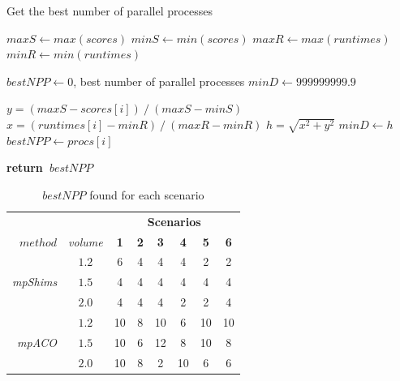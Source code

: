 \documentclass[preprint,authoryear]{elsarticle}
\renewcommand{\Return}{\State \bf {return}~}
\begin{document}
\begin{algorithm}[H]
	\caption{Get the best number of parallel processes}  \label{alg:bestnum}
	\begin{algorithmic}[1]
		
				
		\State $maxS   \gets max(scores)$
		\State $minS   \gets min(scores)$
		\State $maxR \gets max(runtimes)$
		\State $minR \gets min(runtimes)$
		
		\State $bestNPP \gets 0$, best number of parallel processes
		\State $minD \gets 999999999.9$		
		
			\State $y = ( maxS - scores[i] )\ /\ (maxS   - minS  )$ 
			\State $x = ( runtimes[i] - minR )\ /\ (maxR - minR)$ 
			\State $h = \sqrt{x^2 + y^2}$  
				\State $minD \gets h$
				\State $bestNPP \gets procs[i]$
			\EndIf
		
		\EndFor
		
		\Return $bestNPP$
		
		\EndProcedure
	\end{algorithmic}
\end{algorithm}


\vspace{2.0mm}

\begin{table}[H]
\centering
\caption{$bestNPP$ found for each scenario}  \label{tab:numProcs}
	\footnotesize
\begin{tabular}{rccccccc}
\toprule
                               &               &\multicolumn{6}{c}{\bf Scenarios} \\
                               \cmidrule{3-8}
{$method$}                     &{\it volume}&{\bf 1}&{\bf 2}&{\bf 3}&{\bf 4}&{\bf 5}&{\bf 6} \\
\toprule

\multirow{3}{*}{\it {mpShims}} &$1.2$& 6       & 4     & 4     & 4     & 2     & 2    \\ 
                               &$1.5$& 4       & 4     & 4     & 4     & 4     & 4    \\
                               &$2.0$& 4       & 4     & 4     & 2     & 2     & 4    \\
\midrule[.1pt]

\multirow{3}{*}{\it {mpACO}}   &$1.2$& 10      & 8     & 10    & 6     & 10    & 10   \\ 
                               &$1.5$& 10      & 6     & 12    & 8     & 10    & 8    \\
                               &$2.0$& 10      & 8     & 2     & 10    & 6     & 6    \\                               
\bottomrule		
\end{tabular}

\normalsize

\end{table}
\end{document}
